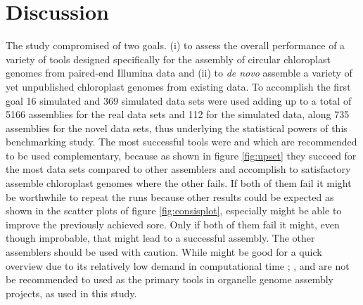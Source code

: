 \section{Discussion} \label{dis_cp}


The study compromised of two goals. (i) to assess the overall performance of a variety of tools designed
specifically for the assembly of circular chloroplast genomes from paired-end Illumina data and (ii) to
\textit{de novo} assemble a variety of yet unpublished chloroplast genomes from existing data. To accomplish
the first goal 16 simulated and 369 simulated data sets were used adding up to a total of 5166 assemblies for
the real data sets and 112 for the simulated data, along 735 assemblies for the novel data sets, thus
underlying the statistical powers of this benchmarking study.  The most successful tools were \go
\hspace{.5ex} and \fp \hspace{.5ex} which are recommended to be used complementary, because as shown in figure
\ref{fig:upset} they succeed for the most data sets compared to other assemblers and accomplish to
satisfactory assemble chloroplast genomes where the other fails. If both of them fail it might be worthwhile
to repeat the runs because other results could be expected as shown in the scatter plots of figure
\ref{fig:consisplot}, especially \fp might be able to improve the previously achieved sore. Only if both of
them fail it might, even though improbable, that \np might lead to a successful assembly. The other assemblers
should be used with caution. While \ce might be good for a quick overview due to its relatively low demand in
computational time \cite{freudenthal2019landscape}; \cassp, \oa and \ioga are not be recommended to used as
the primary tools in organelle genome assembly projects, as used in this study. 

